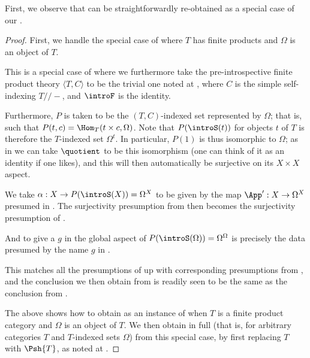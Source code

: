 First, we observe that  can be straightforwardly re-obtained as a special case of our .
\begin{proof}
First, we handle the special case of  where $T$ has finite products and $\Omega$ is an object of $T$.

This is a special case of  where we furthermore take the pre-introspective finite product theory $\langle T, C \rangle$ to be the trivial one noted at , where $C$ is the simple self-indexing $T//-$, and $\introF$ is the identity.

Furthermore, $P$ is taken to be the $(T, C)$-indexed set represented by $\Omega$; that is, such that $P(t, c) = \Hom_T(t \times c, \Omega)$. Note that $P(\introS(t))$ for objects $t$ of $T$ is therefore the $T$-indexed set $\Omega^t$. In particular, $P(1)$ is thus isomorphic to $\Omega$; as in  we can take $\quotient$ to be this isomorphism (one can think of it as an identity if one likes), and this will then automatically be surjective on its $X \times X$ aspect.

We take $\alpha : X \to P(\introS(X)) = \Omega^X$ to be given by the map $\App' : X \to \Omega^X$ presumed in . The surjectivity presumption from  then becomes the surjectivity presumption of . 

And to give a $g$ in the global aspect of $P(\introS(\Omega)) = \Omega^\Omega$ is precisely the data presumed by the name $g$ in .

This matches all the presumptions of  up with corresponding presumptions from , and the conclusion we then obtain from  is readily seen to be the same as the conclusion from .

The above shows how to obtain  as an instance of  when $T$ is a finite product category and $\Omega$ is an object of $T$. We then obtain  in full (that is, for arbitrary categories $T$ and $T$-indexed sets $\Omega$) from this special case, by first replacing $T$ with $\Psh{T}$, as noted at .
\end{proof}

